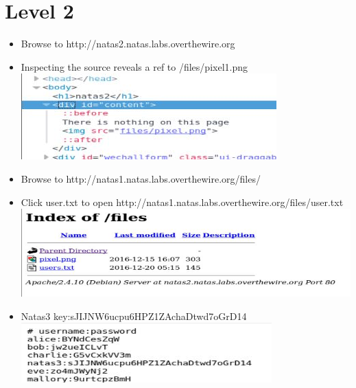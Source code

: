 \documentclass{article}
\begin{document}
\section{Level 2}
    \begin{itemize}
        \item Browse to http://natas2.natas.labs.overthewire.org
        \item Inspecting the source reveals a ref to /files/pixel1.png \\ \includegraphics{natas2/findfiles.JPG}
        \item Browse to http://natas1.natas.labs.overthewire.org/files/ 
        \item Click user.txt to open http://natas1.natas.labs.overthewire.org/files/user.txt \\ \includegraphics{natas2/userfile.JPG}
        \item Natas3 key:sJIJNW6ucpu6HPZ1ZAchaDtwd7oGrD14\\ \includegraphics{natas2/natas2_flag}
    \end{itemize}
    
    
\end{document}
